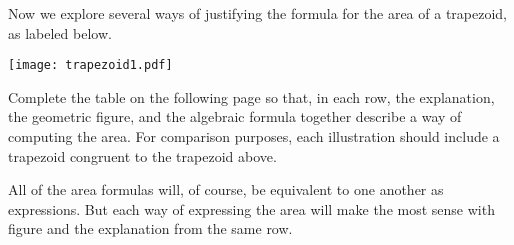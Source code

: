 \documentclass[nooutcomes,instructornotes]{ximera}
\begin{document}
\begin{problem}
Now we explore several ways of justifying the formula for the area of a trapezoid, as labeled below. 
\begin{image}
\texttt{[image: trapezoid1.pdf]}
\end{image}
Complete the table on the following page so that, in each row, the explanation, the geometric figure, and the algebraic formula together describe a way of computing the area.  For comparison purposes, each illustration should include a trapezoid congruent to the trapezoid above.   

All of the area formulas will, of course, be equivalent to one another as expressions.  But each way of expressing the area will make the most sense with figure and the explanation from the same row.  


\newpage

\newlength{\formulawidth}
\end{problem}
\end{document}
